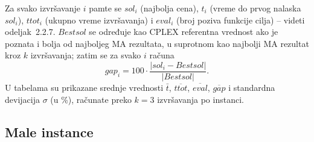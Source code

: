 \documentclass[12pt,a4paper]{article}
\begin{document}
Za svako izvršavanje $i$ pamte se $sol_i$ (najbolja cena), $t_i$ (vreme do
prvog nalaska $sol_i$), $ttot_i$ (ukupno vreme izvršavanja) i $eval_i$ (broj
poziva funkcije cilja) -- videti odeljak~2.2.7. $Bestsol$ se određuje kao
CPLEX referentna vrednost ako je poznata i bolja od najboljeg MA rezultata,
u suprotnom kao najbolji MA rezultat kroz $k$ izvršavanja; zatim se za
svako $i$ računa
\[
  gap_i = 100 \cdot \frac{|sol_i - Bestsol|}{|Bestsol|}.
\]
U tabelama su prikazane srednje vrednosti $\bar t$, $\overline{ttot}$,
$\overline{eval}$, $\overline{gap}$ i standardna devijacija $\sigma$ (u \%),
računate preko $k=3$ izvršavanja po instanci.

\subsection{Male instance}
\end{document}
